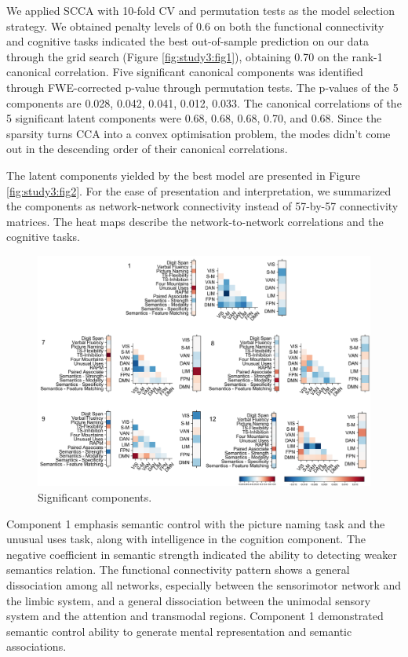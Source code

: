 We applied SCCA with 10-fold CV and permutation tests as the model selection strategy. We obtained penalty levels of 0.6 on both the functional connectivity and cognitive tasks indicated the best out-of-sample prediction on our data through the grid search (Figure \ref{fig:study3:fig1}), obtaining 0.70 on the rank-1 canonical correlation. Five significant canonical components was identified through FWE-corrected p-value through permutation tests. The p-values of the 5 components are 0.028, 0.042, 0.041, 0.012, 0.033. The canonical correlations of the 5 significant latent components were 0.68, 0.68, 0.68, 0.70, and 0.68. Since the sparsity turns CCA into a convex optimisation problem, the modes didn't come out in the descending order of their canonical correlations.

The latent components yielded by the best model are presented in Figure \ref{fig:study3:fig2}. For the ease of presentation and interpretation, we summarized the components as network-network connectivity instead of 57-by-57 connectivity matrices. The heat maps describe the network-to-network correlations and the cognitive tasks.

\begin{figure}[H]
	\centering
	\includegraphics[width=1\textwidth]{study3/image/study3fig3.png}
	\caption{Significant components.}
	\label{fig:study3:fig3}
\end{figure}

Component 1 emphasis semantic control with the picture naming task and the unusual uses task, along with intelligence in the cognition component. The negative coefficient in semantic strength indicated the ability to detecting weaker semantics relation. The functional connectivity pattern shows a general dissociation among all networks, especially between the sensorimotor network and the limbic system, and a general dissociation between the unimodal sensory system and the attention and transmodal regions. Component 1 demonstrated semantic control ability to generate mental representation and semantic associations.

